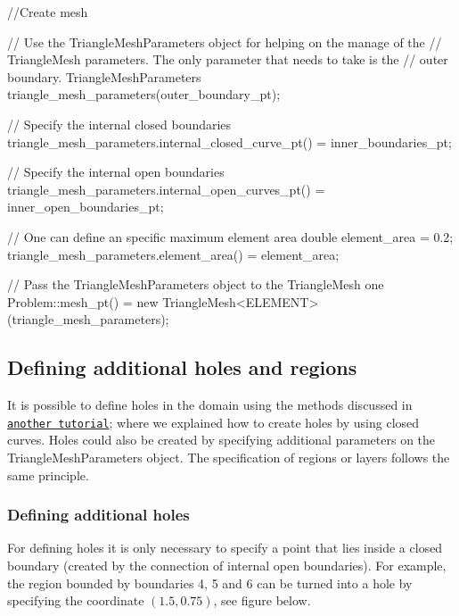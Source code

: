  
\begin{DoxyCodeInclude}
  \textcolor{comment}{//Create mesh}

  \textcolor{comment}{// Use the TriangleMeshParameters object for helping on the manage of the}
  \textcolor{comment}{// TriangleMesh parameters. The only parameter that needs to take is the}
  \textcolor{comment}{// outer boundary.}
  TriangleMeshParameters triangle\_mesh\_parameters(outer\_boundary\_pt);

  \textcolor{comment}{// Specify the internal closed boundaries}
  triangle\_mesh\_parameters.internal\_closed\_curve\_pt() = inner\_boundaries\_pt;

  \textcolor{comment}{// Specify the internal open boundaries}
  triangle\_mesh\_parameters.internal\_open\_curves\_pt() = inner\_open\_boundaries\_pt;

  \textcolor{comment}{// One can define an specific maximum element area}
  \textcolor{keywordtype}{double} element\_area = 0.2;
  triangle\_mesh\_parameters.element\_area() = element\_area;

  \textcolor{comment}{// Pass the TriangleMeshParameters object to the TriangleMesh one}
  Problem::mesh\_pt() = \textcolor{keyword}{new} TriangleMesh<ELEMENT>(triangle\_mesh\_parameters);

\end{DoxyCodeInclude}




 

\hypertarget{index_def_extra}{}\subsection{Defining additional holes and regions}\label{index_def_extra}
It is possible to define holes in the domain using the methods discussed in \href{../../../../doc/meshes/mesh_from_inline_triangle/html/index.html}{\tt another tutorial}; where we explained how to create holes by using closed curves. Holes could also be created by specifying additional parameters on the {\ttfamily Triangle\+Mesh\+Parameters} object. The specification of regions or layers follows the same principle.\hypertarget{index_def_extra_holes}{}\subsubsection{Defining additional holes}\label{index_def_extra_holes}
For defining holes it is only necessary to specify a point that lies inside a closed boundary (created by the connection of internal open boundaries). For example, the region bounded by boundaries 4, 5 and 6 can be turned into a hole by specifying the coordinate $ ( 1.5, 0.75) $, see figure below.

